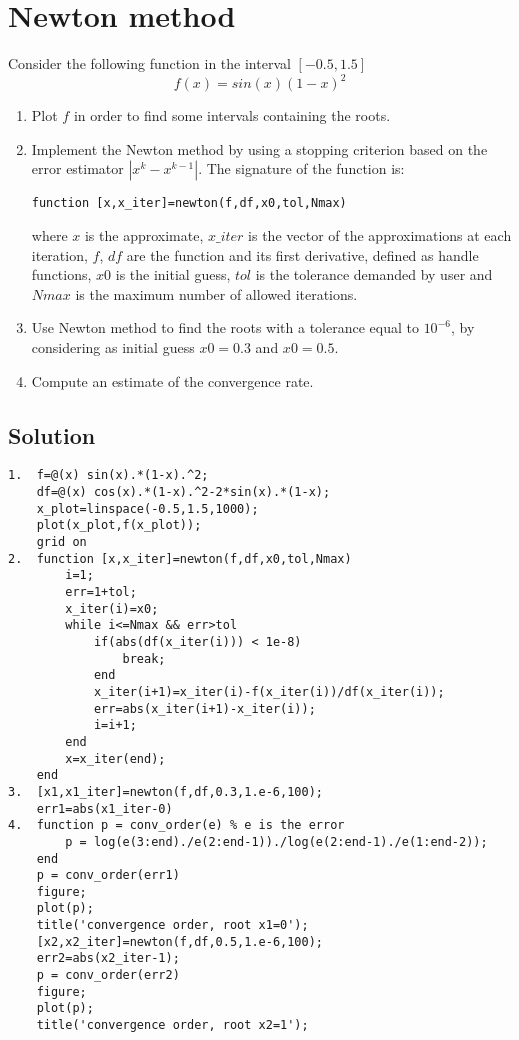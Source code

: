 \documentclass[12pt, a4paper]{report}
\begin{document}
    \newpage

    \section{Newton method}
        Consider the following function in the interval $[-0.5, 1.5]$
        \[f (x) = sin(x)(1 - x)^2\]
        \begin{enumerate}
            \item Plot $f$ in order to find some intervals containing the roots. 
            \item Implement the Newton method by using a stopping criterion based on the error estimator $\left\lvert x^k - x^{k-1}\right\rvert$. The signature of the function is:
                \begin{lstlisting}[style=Matlab]
function [x,x_iter]=newton(f,df,x0,tol,Nmax)
                \end{lstlisting}  
                where $x$ is the approximate, $x\_iter$ is the vector of the approximations at each iteration, $f$, $df$ are the function and its first derivative, defined as
                handle functions, $x0$ is the initial guess, $tol$ is the tolerance demanded by user and $Nmax$ is the maximum number of allowed iterations.
            \item Use Newton method to find the roots with a tolerance equal to $10^{-6}$, by considering as initial guess $x0 = 0.3$ and $x0 = 0.5$.
            \item Compute an estimate of the convergence rate. 
        \end{enumerate}
    \subsection*{Solution}
        \begin{lstlisting}[style=Matlab]
1.  f=@(x) sin(x).*(1-x).^2;
    df=@(x) cos(x).*(1-x).^2-2*sin(x).*(1-x);
    x_plot=linspace(-0.5,1.5,1000);
    plot(x_plot,f(x_plot));
    grid on
2.  function [x,x_iter]=newton(f,df,x0,tol,Nmax)
        i=1;
        err=1+tol;
        x_iter(i)=x0;
        while i<=Nmax && err>tol
            if(abs(df(x_iter(i))) < 1e-8) 
                break;
            end
            x_iter(i+1)=x_iter(i)-f(x_iter(i))/df(x_iter(i));
            err=abs(x_iter(i+1)-x_iter(i));
            i=i+1;
        end
        x=x_iter(end);
    end
3.  [x1,x1_iter]=newton(f,df,0.3,1.e-6,100);
    err1=abs(x1_iter-0)
4.  function p = conv_order(e) % e is the error
        p = log(e(3:end)./e(2:end-1))./log(e(2:end-1)./e(1:end-2));
    end
    p = conv_order(err1)
    figure;
    plot(p);
    title('convergence order, root x1=0');
    [x2,x2_iter]=newton(f,df,0.5,1.e-6,100);
    err2=abs(x2_iter-1);
    p = conv_order(err2)
    figure;
    plot(p);
    title('convergence order, root x2=1');
        \end{lstlisting}  
\end{document}
